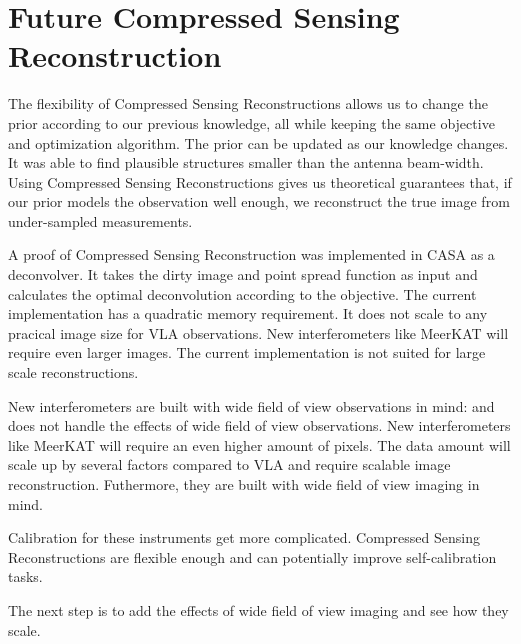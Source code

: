 \section{Future Compressed Sensing Reconstruction}
The flexibility of Compressed Sensing Reconstructions allows us to change the prior according to our previous knowledge, all while keeping the same objective and optimization algorithm. The prior can be updated as our knowledge changes. It was able to find plausible structures smaller than the antenna beam-width. Using Compressed Sensing Reconstructions gives us theoretical guarantees that,  if our prior models the observation well enough, we reconstruct the true image from under-sampled measurements.


A proof of Compressed Sensing Reconstruction was implemented in CASA as a deconvolver. It takes the dirty image and point spread function as input and calculates the optimal deconvolution according to the objective. The current implementation has a quadratic memory requirement. It does not scale to any pracical image size for VLA observations. New interferometers like MeerKAT will require even larger images. The current implementation is not suited for large scale reconstructions. 

New interferometers are built with wide field of view observations in mind:
and does not handle the effects of wide field of view observations.  New interferometers like MeerKAT will require an even higher amount of pixels. The data amount will scale up by several factors compared to VLA and require scalable image reconstruction. Futhermore, they are built with wide field of view imaging in mind. 

Calibration for these instruments get more complicated. Compressed Sensing Reconstructions are flexible enough and can potentially improve self-calibration tasks.

The next step is to add the effects of wide field of view imaging and see how they scale.

